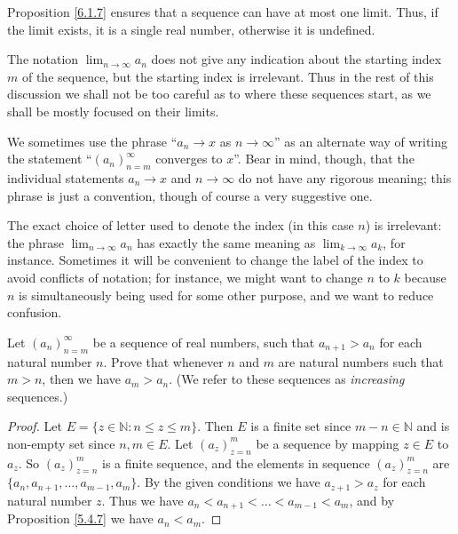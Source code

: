 \begin{note}
Proposition \ref{6.1.7} ensures that a sequence can have at most one limit.
Thus, if the limit exists, it is a single real number, otherwise it is undefined.
\end{note}

\begin{remark}\label{6.1.9}
The notation \(\lim_{n \to \infty} a_n\) does not give any indication about the starting index \(m\) of the sequence, but the starting index is irrelevant.
Thus in the rest of this discussion we shall not be too careful as to where these sequences start, as we shall be mostly focused on their limits.
\end{remark}

\begin{note}
We sometimes use the phrase ``\(a_n \to x\) as \(n \to \infty\)'' as an alternate way of writing the statement ``\((a_n)_{n = m}^\infty\) converges to \(x\)''.
Bear in mind, though, that the individual statements \(a_n \to x\) and \(n \to \infty\) do not have any rigorous meaning;
this phrase is just a convention, though of course a very suggestive one.
\end{note}

\begin{remark}\label{6.1.10}
The exact choice of letter used to denote the index (in this case \(n\)) is irrelevant:
the phrase \(\lim_{n \to \infty} a_n\) has exactly the same meaning as \(\lim_{k \to \infty} a_k\), for instance.
Sometimes it will be convenient to change the label of the index to avoid conflicts of notation;
for instance, we might want to change \(n\) to \(k\) because \(n\) is simultaneously being used for some other purpose, and we want to reduce confusion.
\end{remark}

\exercisesection

\begin{exercise}\label{ex 6.1.1}
Let \((a_n)_{n = m}^\infty\) be a sequence of real numbers, such that \(a_{n + 1} > a_n\) for each natural number \(n\).
Prove that whenever \(n\) and \(m\) are natural numbers such that \(m > n\), then we have \(a_m > a_n\).
(We refer to these sequences as \emph{increasing} sequences.)
\end{exercise}

\begin{proof}
Let \(E = \{z \in \mathds{N} : n \leq z \leq m\}\).
Then \(E\) is a finite set since \(m - n \in \mathds{N}\) and is non-empty set since \(n, m \in E\).
Let \((a_z)_{z = n}^m\) be a sequence by mapping \(z \in E\) to \(a_z\).
So \((a_z)_{z = n}^m\) is a finite sequence, and the elements in sequence \((a_z)_{z = n}^m\) are \(\{a_n, a_{n + 1}, \dots, a_{m - 1}, a_m\}\).
By the given conditions we have \(a_{z + 1} > a_z\) for each natural number \(z\).
Thus we have \(a_n < a_{n + 1} < \dots < a_{m - 1} < a_m\), and by Proposition \ref{5.4.7} we have \(a_n < a_m\).
\end{proof}

